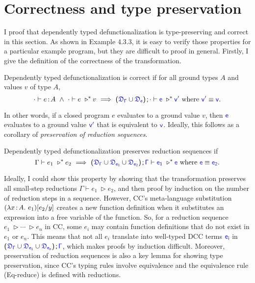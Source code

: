 
\section{Correctness and type preservation}
\label{sec:5.1}
I proof that dependently typed defunctionalization is type-preserving and correct in this section. As shown in Example 4.3.3, it is easy to verify those properties for a particular example program, but they are difficult to proof in general. Firstly, I give the definition of the correctness of the transformation.

\begin{definition}
Dependently typed defunctionalization is correct if for all ground types $A$ and values $v$ of type $A$,
\begin{equation*}
	\cdot \vdash e \goodcolon A \ \land \
	\cdot \vdash e\ \triangleright^* v\ \Longrightarrow\ 
	\sfpl \target{\fdef_{\Gamma}} \cup \target{\fdef_{e}} \sfpr \semicolon \target{\cdot} \vdash \target{e}\ \triangleright^* \target{v'} \text{ where } \target{v'} \equiv \target{v}.
\end{equation*}
\end{definition}
In other words, if a closed program $e$ evaluates to a ground value $v$, then $\target{e}$ evaluates to a ground value $\target{v'}$ that is equivalent to $\target{v}$. Ideally, this follows as a corollary of \textit{preservation of reduction sequences}.
\begin{definition}
Dependently typed defunctionalization preserves reduction sequences if
\begin{equation*}
	\Gamma \vdash e_1\ \triangleright^* e_2\ \Longrightarrow\ 
	\sfpl \target{\fdef_{\Gamma}} \cup \target{\fdef_{e_1}} \cup \target{\fdef_{e_2}} \sfpr \semicolon \target{\Gamma} \vdash
	\target{e_1}\ \triangleright^* \target{e} \text{ where } \target{e} \equiv \target{e_2}.
\end{equation*}
\end{definition}

Ideally, I could show this property by showing that the transformation preserves all small-step reductions $\Gamma \vdash e_1\ \triangleright e_2$, and then proof by induction on the number of reduction steps in a sequence. However, CC's meta-language substitution $(\lambda x\hspace{0.5mm}{:}\hspace{0.5mm} A.\ e_1)[e_2\slash y]$ creates a new function definition when it substitutes an expression into a free variable of the function.
So, for a reduction sequence $e_1\ \triangleright \cdots \ \triangleright e_n$ in CC, some $e_i$ may contain function definitions that do not exist in $e_1$ or $e_n$. This means that not all $e_i$ translate into well-typed DCC terms $\target{e_i}$ in $\sfpl \target{\fdef_{\Gamma}} \cup \target{\fdef_{e_1}} \cup \target{\fdef_{e_n}} \sfpr \semicolon \target{\Gamma}$, which makes proofs by induction difficult. Moreover, preservation of reduction sequences is also a key lemma for showing type preservation, since CC's typing rules involve equivalence and the equivalence rule (Eq-reduce) is defined with reductions.

